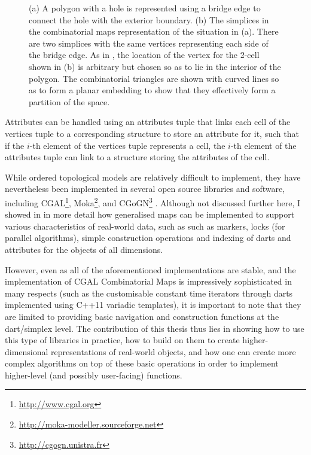 \begin{figure}[tbp]
{\label{subfig:bridge-2}}
\caption[Representing holes using bridges]{(a) A polygon with a hole is represented using a bridge edge to connect the hole with the exterior boundary.
(b) The simplices in the combinatorial maps representation of the situation in (a).
There are two simplices with the same vertices representing each side of the bridge edge.
As in , the location of the vertex for the 2-cell shown in (b) is arbitrary but chosen so as to lie in the interior of the polygon.
The combinatorial triangles are shown with curved lines so as to form a planar embedding to show that they effectively form a partition of the space.}
\label{fig:bridge}
\end{figure}
Attributes can be handled using an attributes tuple that links each cell of the vertices tuple to a corresponding structure to store an attribute for it, such that if the $i$-th element of the vertices tuple represents a cell, the $i$-th element of the attributes tuple can link to a structure storing the attributes of the cell.

While ordered topological models are relatively difficult to implement, they have nevertheless been implemented in several open source libraries and software, including CGAL\footnote{\url{http://www.cgal.org}}, Moka\footnote{\url{http://moka-modeller.sourceforge.net}}, and CGoGN\footnote{\url{http://cgogn.unistra.fr}} \citep{Kraemer14}.
Although not discussed further here, I showed in \citet{ArroyoOhori13a} in more detail how generalised maps can be implemented to support various characteristics of real-world data, such as such as markers, locks (for parallel algorithms), simple construction operations and indexing of darts and attributes for the objects of all dimensions.

However, even as all of the aforementioned implementations are stable, and the implementation of CGAL Combinatorial Maps is impressively sophisticated in many respects (such as the customisable constant time iterators through darts implemented using C++11 variadic templates), it is important to note that they are limited to providing basic navigation and construction functions at the dart/simplex level.
The contribution of this thesis thus lies in showing how to use this type of libraries in practice, how to build on them to create higher-dimensional representations of real-world objects, and how one can create more complex algorithms on top of these basic operations in order to implement higher-level (and possibly user-facing) functions.

